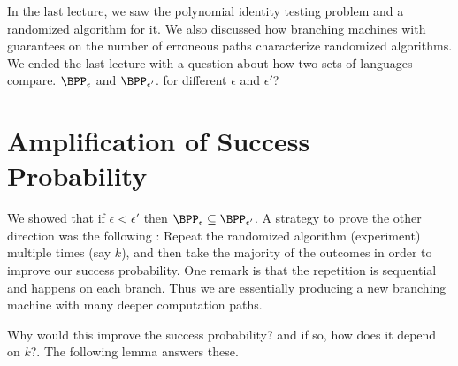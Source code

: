 
In the last lecture, we saw the polynomial identity testing problem
and a randomized algorithm for it. We also discussed how branching machines with
guarantees on the number of erroneous paths characterize randomized
algorithms. We ended the last lecture with a question about how two
sets of languages compare. $\BPP_{\epsilon}$ and $\BPP_{\epsilon'}$.
for different $\epsilon$ and $\epsilon'$? 

\section{Amplification of Success Probability}

We showed that if $\epsilon < \epsilon'$ then $\BPP_{\epsilon} \subseteq \BPP_{\epsilon'}$. A strategy to prove the other direction was the following : Repeat the randomized algorithm (experiment) multiple
times (say $k$), and then take the majority of the outcomes in order to improve our success probability.
One remark is that the repetition is sequential and happens on each
branch. Thus we are essentially producing a new branching machine with
many deeper computation paths. 

Why would this improve the success probability? and if so, how does it depend on $k$?. 
The following lemma answers these.

